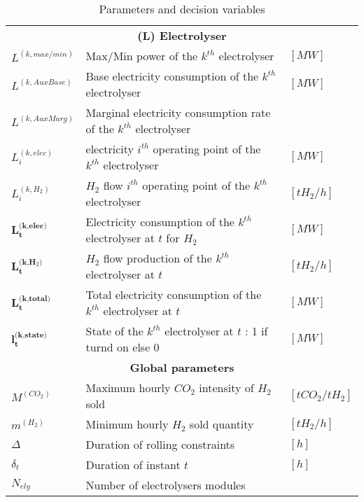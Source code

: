 \begin{table*}
    \centering
    \tiny
    \caption{Parameters and decision variables}
    \begin{tabular}{|p{3.5cm}p{6.5cm}p{5cm}|}
    \hline
    \multicolumn{3}{|c|}{\textbf{(L) Electrolyser}} \\[0.3cm]
    $L^{(k,max/min)}$                   & Max/Min power of the $k^{th}$ electrolyser                                        & $[MW]$ \\
    $L^{(k,AuxBase)}$                   & Base electricity consumption of the $k^{th}$ electrolyser                         & $[MW]$ \\
    $L^{(k,AuxMarg)}$                   & Marginal electricity consumption rate of the $k^{th}$ electrolyser                &  \\
    $L_i^{(k,elec)}$                    & electricity $i^{th}$ operating point of the $k^{th}$ electrolyser                 & $[MW]$ \\
    $L_i^{(k,H_2)}$                     & $H_2$ flow $i^{th}$ operating point of the $k^{th}$ electrolyser                  & $[tH_2/h]$ \\[0.3cm]
    $\textbf{L}_\textbf{t}^{\textbf{(k,elec)}}$           & Electricity consumption of the $k^{th}$ electrolyser at $t$ for $H_2$             & $[MW]$ \\
    $\textbf{L}_\textbf{t}^{\textbf{(k,H$_2$)}}$            & $H_2$ flow production of the $k^{th}$ electrolyser at $t$                         & $[tH_2/h]$ \\
    $\textbf{L}_\textbf{t}^{\textbf{(k,total)}}$          & Total electricity consumption of the $k^{th}$ electrolyser at $t$                 & $[MW]$ \\
    $\textbf{l}_\textbf{t}^{\textbf{(k,state)}}$          & State of the $k^{th}$ electrolyser at $t$ : 1 if turnd on else 0                  & $[MW]$ \\[0.3cm]
    \multicolumn{3}{|c|}{\textbf{Global parameters}} \\[0.3cm]
    $M^{(CO_2)}$                    & Maximum hourly $CO_2$ intensity of $H_2$ sold                                         & $[tCO_2/tH_2]$ \\
    $m^{(H_2)}$                     & Minimum hourly $H_2$ sold quantity                                                    & $[tH_2/h]$ \\
    $\Delta$                        & Duration of rolling constraints                                                       & $[h]$ \\
    $\delta_t$                      & Duration of instant $t$                                                               & $[h]$ \\
    $N_{ely}$                       & Number of electrolysers modules                                                       & \\
    \hline     
    \end{tabular}
    \label{tab:system_parameters_and_DV}
\end{table*}